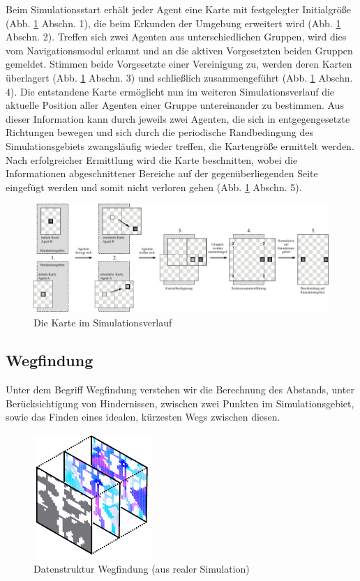\documentclass[runningheads]{llncs}
\begin{document}
	Beim Simulationsstart erhält jeder Agent eine Karte mit festgelegter Initialgröße (Abb. \ref{Karte} Abschn. 1), die beim Erkunden der Umgebung erweitert wird (Abb. \ref{Karte} Abschn. 2). Treffen sich zwei Agenten aus unterschiedlichen Gruppen, wird dies vom Navigationsmodul erkannt und an die aktiven Vorgesetzten beiden Gruppen gemeldet. Stimmen beide Vorgesetzte einer Vereinigung zu, werden deren Karten überlagert (Abb. \ref{Karte} Abschn. 3) und schließlich zusammengeführt (Abb. \ref{Karte} Abschn. 4). Die entstandene Karte ermöglicht nun im weiteren Simulationsverlauf die aktuelle Position aller Agenten einer Gruppe untereinander zu bestimmen. Aus dieser Information kann durch jeweils zwei Agenten, die sich in entgegengesetzte Richtungen bewegen und sich durch die periodische Randbedingung \cite{Bungartz2013} des Simulationsgebiets zwangsläufig wieder treffen, die Kartengröße ermittelt werden. Nach erfolgreicher Ermittlung wird die Karte beschnitten, wobei die Informationen abgeschnittener Bereiche auf der gegenüberliegenden Seite eingefügt werden und somit nicht verloren gehen (Abb. \ref{Karte} Abschn. 5).
	\vspace{-3mm}
	\begin{figure}[h]
		\includegraphics[scale=0.8]{./Referenzen/Kartenmerge.pdf}
		\caption{Die Karte im Simulationsverlauf}
		\label{Karte}
	\end{figure}
	
	\vspace{-8mm}
	\subsection{Wegfindung}\label{wegfindung}
	Unter dem Begriff Wegfindung verstehen wir die Berechnung des Abstands, unter Berücksichtigung von Hindernissen, zwischen zwei Punkten im Simulationsgebiet, sowie das Finden eines idealen, kürzesten Wegs zwischen diesen.
	
	\begin{figure}
		\vspace{-5mm}
		\includegraphics{./Referenzen/Pathfinding.pdf}
		\caption{Datenstruktur Wegfindung (aus realer Simulation)}
		\label{pathfinding}
	\end{figure}
	
\end{document}

